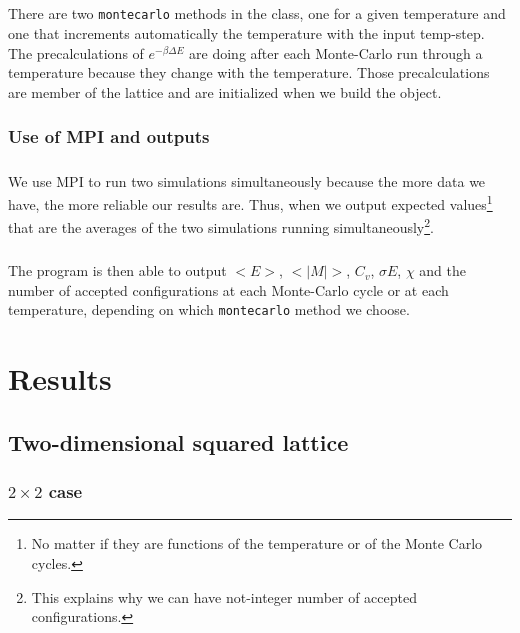 \documentclass[a4paper, twoside, 11pt]{report}
\theoremstyle{theorem}
\theoremstyle{remark}
\theoremstyle{exemple}
\begin{document}
        \paragraph{}There are two \texttt{montecarlo} methods in the class, one for a given temperature and one that increments automatically the temperature with the input temp-step. The precalculations of ${e}^{-\beta\Delta E}$ are doing after each Monte-Carlo run through a temperature because they change with the temperature. Those precalculations are member of the lattice and are initialized when we build the object.  
        
        \subsection{Use of MPI and outputs}
        
        	\paragraph{}We use MPI to run two simulations simultaneously because the more data we have, the more reliable our results are. Thus, when we output expected values\footnote{No matter if they are functions of the temperature or of the Monte Carlo cycles.} that are the averages of the two simulations running simultaneously\footnote{This explains why we can have not-integer number of accepted configurations.}.
	
			\paragraph{}The program is then able to output $<E>$, $<|M|>$, $C_v$, $\sigma E$, $\chi$ and the number of accepted configurations at each Monte-Carlo cycle or at each temperature, depending on which \texttt{montecarlo} method we choose.


\chapter{Results}

    \section{Two-dimensional squared lattice}
    
        \subsection{$2\times2$ case}
        
\end{document}
